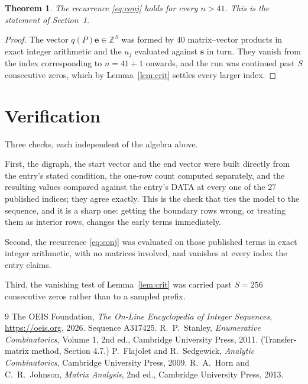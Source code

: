 \documentclass[11pt,a4paper]{article}
\theoremstyle{plain}
\newtheorem{theorem}{Theorem}
\theoremstyle{definition}
\begin{document}
\begin{theorem}
The recurrence \eqref{eq:conj} holds for every $n>41$. This is the statement of
Section~1.
\end{theorem}

\begin{proof}
The vector $q(P)\mathbf{e}\in\mathbb{Z}^{S}$ was formed by $40$ matrix--vector
products in exact integer arithmetic and the $u_j$ evaluated against $\mathbf{s}$ in turn.
They vanish from the index corresponding to $n=41+1$ onwards, and the run was continued
past $S$ consecutive zeros, which by Lemma~\ref{lem:crit} settles every larger index.
\end{proof}

\section{Verification}

Three checks, each independent of the algebra above.

First, the digraph, the start vector and the end vector were built directly from the
entry's stated condition, the one-row count computed separately, and the resulting values
compared against the entry's DATA at every one of the $27$ published indices; they
agree exactly. This is the check that ties the model to the sequence, and it is a sharp one:
getting the boundary rows wrong, or treating them as interior rows, changes the early terms
immediately.

Second, the recurrence \eqref{eq:conj} was evaluated on those published terms in exact
integer arithmetic, with no matrices involved, and vanishes at every index the entry claims.

Third, the vanishing test of Lemma~\ref{lem:crit} was carried past $S=256$ consecutive
zeros rather than to a sampled prefix.

\begin{thebibliography}{9}
 The OEIS Foundation, \emph{The On-Line Encyclopedia of Integer
Sequences}, \url{https://oeis.org}, 2026. Sequence A317425.
 R.~P.~Stanley, \emph{Enumerative Combinatorics}, Volume 1, 2nd ed.,
Cambridge University Press, 2011. (Transfer-matrix method, Section 4.7.)
 P.~Flajolet and R.~Sedgewick, \emph{Analytic Combinatorics}, Cambridge
University Press, 2009.
 R.~A.~Horn and C.~R.~Johnson, \emph{Matrix Analysis}, 2nd ed., Cambridge
University Press, 2013.
\end{thebibliography}
\end{document}
